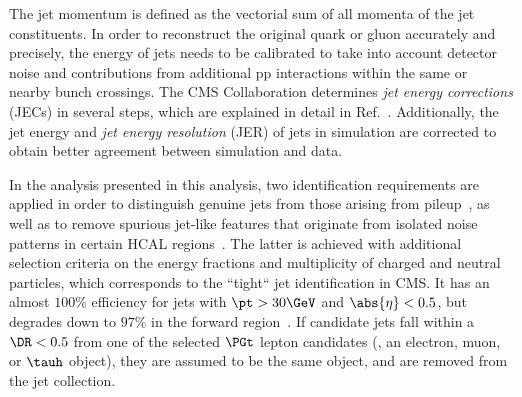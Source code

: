 The jet momentum is defined as the vectorial sum of all momenta of the jet constituents.
In order to reconstruct the original quark or gluon accurately and precisely, the energy of jets needs to be calibrated to take into account detector noise and contributions from additional pp interactions within the same or nearby bunch crossings.
The CMS Collaboration determines \emph{jet energy corrections} (JECs) in several steps, which are explained in detail in Ref.~\cite{CMS-JME-10-011}.
Additionally, the jet energy and \emph{jet energy resolution} (JER) of jets in simulation are corrected to obtain better agreement between simulation and data.

In the analysis presented in this analysis, two identification requirements are applied in order to distinguish genuine jets from those arising from pileup~\cite{jetPUID}, as well as to remove spurious jet-like features that originate from isolated noise patterns in certain HCAL regions~\cite{jetID_2016}.
The latter is achieved with additional selection criteria on the energy fractions and multiplicity of charged and neutral particles, which corresponds to the ``tight`` jet identification in CMS. It has an almost $100\%$ efficiency for jets with $\pt>30\GeV$ and $\abs{\eta}<0.5$, but degrades down to $97\%$ in the forward region~\cite{jetID_2016}. %
If candidate jets fall within a $\DR<0.5$ from one of the selected $\PGt$ lepton candidates (\ie, an electron, muon, or $\tauh$ object), they are assumed to be the same object, and are removed from the jet collection.

